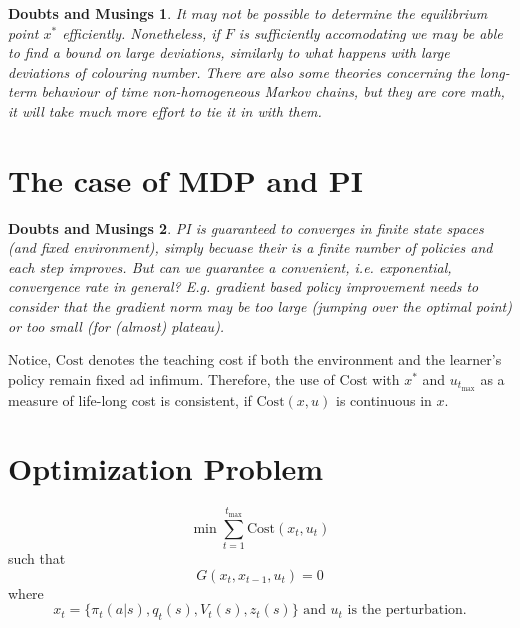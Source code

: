 \documentclass{article}
\newcommand{\ct}{\ensuremath{\mathrm{Cost}(x_t,u_t)}}
\newtheorem{doubt}{Doubts and Musings}
\begin{document}
\begin{doubt}
It may not be possible to determine the equilibrium point $x^*$
efficiently. Nonetheless, if $F$ is sufficiently accomodating we may
be able to find a bound on large deviations, similarly to what happens
with large deviations of colouring number. There are also some
theories concerning the long-term behaviour of time non-homogeneous
Markov chains, but they are core math, it will take much more effort
to tie it in with them.
\end{doubt}

\section*{The case of MDP and PI}

\begin{doubt}
PI is guaranteed to converges in finite state spaces (and fixed
environment), simply becuase their is a finite number of policies and
each step improves. But can we guarantee a convenient,
i.e. exponential, convergence rate in general? E.g. gradient based
policy improvement needs to consider that the gradient norm may be too
large (jumping over the optimal point) or too small (for (almost)
plateau).
\end{doubt}


Notice, $\mathrm{Cost}$ denotes the teaching cost if both the
environment and the learner's policy remain fixed ad
infimum. Therefore, the use of $\mathrm{Cost}$ with $x^*$ and
$u_{t_{\max}}$ as a measure of life-long cost is consistent, if
$\mathrm{Cost}(x,u)$ is continuous in $x$.


\section*{Optimization Problem}
\[
\min \sum_{t=1}^{t_{\max}} \ct
\]
such that
\[
G(x_t,x_{t-1},u_t)=0
\]
where
\[
x_t=\{\pi_t(a|s),q_t(s),V_{t}(s),z_t(s)\} \mbox{ and $u_t$ is the perturbation.}
\]



\end{document}
